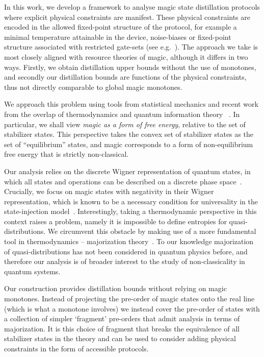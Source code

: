 \documentclass[pra,
aps,
twocolumn,
superscriptaddress,
groupedaddress,
nofootinbib,
reprint
]{revtex4-1}
\begin{document}
In this work, we develop a framework to analyse magic state distillation protocols where explicit physical constraints are manifest. These physical constraints are encoded in the allowed fixed-point structure of the protocol, for example a minimal temperature attainable in the device, noise-biases or fixed-point structure associated with restricted gate-sets (see e.g.~\cite{Aliferis_2008, Stephens_2013, Li_2015, Babbush_2018, Tuckett_2019, Guillaud_2019, Fowler_2019}). The approach we take is most closely aligned with resource theories of magic, although it differs in two ways. Firstly, we obtain distillation upper bounds without the use of monotones, and secondly our distillation bounds are functions of the physical constraints, thus not directly comparable to global magic monotones.

We approach this problem using tools from statistical mechanics and recent work from the overlap of thermodynamics and quantum information theory~\cite{cit:gour, cit:gour2} . In particular, we shall view \emph{magic as a form of free energy}, relative to the set of stabilizer states. This perspective takes the convex set of stabilizer states as the set of ``equilibrium'' states, and magic corresponds to a form of non-equilibrium free energy that is strictly non-classical.

Our analysis relies on the discrete Wigner representation of quantum states, in which all states and operations can be described on a discrete phase space~\cite{Ferrie_2008, Okay_2021}. Crucially, we focus on magic states with negativity in their Wigner representation, which is known to be a necessary condition for universality in the state-injection model~\cite{cit:veitch, cit:mari, cit:gottesman, cit:knill, Campbell_2011}. Interestingly, taking a thermodynamic perspective in this context raises a problem, namely it is impossible to define entropies for quasi-distributions. We circumvent this obstacle by making use of a more fundamental tool in thermodynamics -- majorization theory~\cite{cit:marshall, Veinott_1971, Ruch_1976}. To our knowledge majorization of quasi-distributions has not been considered in quantum physics before, and therefore our analysis is of broader interest to the study of non-classicality in quantum systems.

Our construction provides distillation bounds without relying on magic monotones. Instead of projecting the pre-order of magic states onto the real line (which is what a monotone involves) we instead cover the pre-order of states with a collection of simpler `fragment' pre-orders that admit analysis in terms of majorization. It is this choice of fragment that breaks the equivalence of all stabilizer states in the theory and can be used to consider adding physical constraints in the form of accessible protocols.
\end{document}
